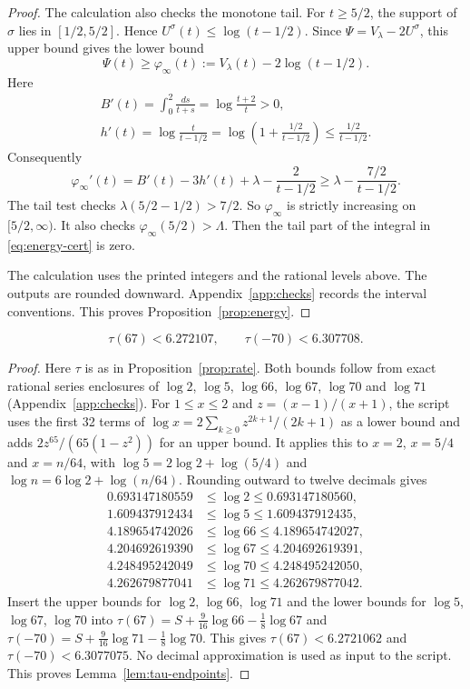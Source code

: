\begin{proof}
The calculation also checks the monotone tail. For \(t\ge5/2\), the support of \(\sigma\) lies in \([1/2,5/2]\). Hence \(U^\sigma(t)\le\log(t-1/2)\). Since \(\Psi=V_\lambda-2U^\sigma\), this upper bound gives the lower bound
\[
 \Psi(t)\ge \varphi_\infty(t):=V_\lambda(t)-2\log(t-1/2).
\]
Here
\[
\begin{gathered}
 B'(t)=\int_0^2\frac{ds}{t+s}=\log\frac{t+2}{t}>0,\\
 h'(t)=\log\frac{t}{t-1/2}
       =\log\left(1+\frac{1/2}{t-1/2}\right)
       \le\frac{1/2}{t-1/2}.
\end{gathered}
\]
Consequently
\[
 \varphi_\infty'(t)=B'(t)-3h'(t)+\lambda-\frac{2}{t-1/2}
 \ge\lambda-\frac{7/2}{t-1/2}.
\]
The tail test checks \(\lambda(5/2-1/2)>7/2\). So \(\varphi_\infty\) is strictly increasing on \([5/2,\infty)\). It also checks \(\varphi_\infty(5/2)>\Lambda\). Then the tail part of the integral in \eqref{eq:energy-cert} is zero.

The calculation uses the printed integers and the rational levels above. The outputs are rounded downward. Appendix~\ref{app:checks} records the interval conventions. This proves Proposition~\ref{prop:energy}.
\end{proof}

\begin{lemma}\label{lem:tau-endpoints}
\[
 \tau(67)<6.272107,\qquad \tau(-70)<6.307708.
\]
\end{lemma}

\begin{proof}
Here \(\tau\) is as in Proposition~\ref{prop:rate}. Both bounds follow from exact rational series enclosures of \(\log2\), \(\log5\), \(\log66\), \(\log67\), \(\log70\) and \(\log71\) (Appendix~\ref{app:checks}). For \(1\le x\le2\) and \(z=(x-1)/(x+1)\), the script uses the first 32 terms of \(\log x=2\sum_{k\ge0}z^{2k+1}/(2k+1)\) as a lower bound and adds \(2z^{65}/(65(1-z^2))\) for an upper bound. It applies this to \(x=2\), \(x=5/4\) and \(x=n/64\), with \(\log5=2\log2+\log(5/4)\) and \(\log n=6\log2+\log(n/64)\). Rounding outward to twelve decimals gives
\[
\begin{aligned}
 0.693147180559&\le\log2\le0.693147180560,\\
 1.609437912434&\le\log5\le1.609437912435,\\
 4.189654742026&\le\log66\le4.189654742027,\\
 4.204692619390&\le\log67\le4.204692619391,\\
 4.248495242049&\le\log70\le4.248495242050,\\
 4.262679877041&\le\log71\le4.262679877042.
\end{aligned}
\]
Insert the upper bounds for \(\log2\), \(\log66\), \(\log71\) and the lower bounds for \(\log5\), \(\log67\), \(\log70\) into \(\tau(67)=S+\frac9{16}\log66-\frac18\log67\) and \(\tau(-70)=S+\frac9{16}\log71-\frac18\log70\). This gives \(\tau(67)<6.2721062\) and \(\tau(-70)<6.3077075\). No decimal approximation is used as input to the script. This proves Lemma~\ref{lem:tau-endpoints}.
\end{proof}

